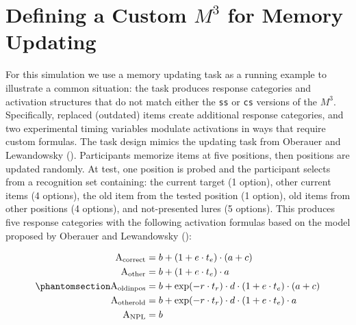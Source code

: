 \documentclass[
  man,
  floatsintext,
  longtable,
  nolmodern,
  notxfonts,
  notimes,
  colorlinks=true,linkcolor=blue,citecolor=blue,urlcolor=blue]{apa7}
\begin{document}
\section{\texorpdfstring{Defining a Custom \(M^3\) for Memory
Updating}{Defining a Custom M\^{}3 for Memory Updating}}\label{defining-a-custom-m3-for-memory-updating}

For this simulation we use a memory updating task as a running example
to illustrate a common situation: the task produces response categories
and activation structures that do not match either the \texttt{ss} or
\texttt{cs} versions of the \(M^3\). Specifically, replaced (outdated)
items create additional response categories, and two experimental timing
variables modulate activations in ways that require custom formulas. The
task design mimics the updating task from Oberauer and Lewandowsky
(). Participants memorize items
at five positions, then positions are updated randomly. At test, one
position is probed and the participant selects from a recognition set
containing: the current target (1 option), other current items (4
options), the old item from the tested position (1 option), old items
from other positions (4 options), and not-presented lures (5 options).
This produces five response categories with the following activation
formulas based on the model proposed by Oberauer and Lewandowsky
():

\begin{equation}\phantomsection\label{eq-act-updating}{
\begin{aligned}
\text{A}_{\text{correct}}  &= b + (1 + e \cdot t_e) \cdot (a + c) \\
\text{A}_{\text{other}}    &= b + (1 + e \cdot t_e) \cdot a \\
\text{A}_{\text{oldinpos}} &= b + \exp(-r \cdot t_r) \cdot d \cdot (1 + e \cdot t_e) \cdot (a + c) \\
\text{A}_{\text{otherold}} &= b + \exp(-r \cdot t_r) \cdot d \cdot (1 + e \cdot t_e) \cdot a \\
\text{A}_{\text{NPL}}      &= b
\end{aligned}
}\end{equation}
\end{document}
